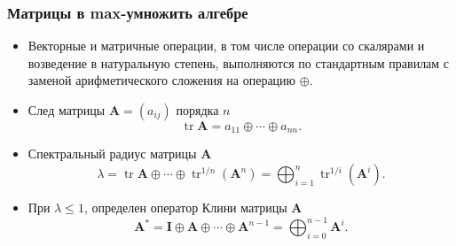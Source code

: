 \documentclass[ucs, notheorems, handout]{beamer}
\begin{document}
\begin{frame}
    \frametitle{Матрицы в max-умножить алгебре}
    \begin{itemize}
        \item Векторные и матричные операции, в том числе операции со скалярами и возведение в натуральную степень, выполняются по стандартным правилам с заменой арифметического сложения на операцию $\oplus$. 
        
        
        
        
        \item След матрицы $\bm{A}=(a_{ij})$ порядка $n$
        $$\mathop\mathrm{tr}\bm{A}=a_{11}\oplus\cdots\oplus a_{nn}.$$

        \item Спектральный радиус матрицы $\bm{A}$
        \begin{equation*}
        \lambda
        =
        \mathop\mathrm{tr}\bm{A}\oplus\cdots\oplus\mathop\mathrm{tr}\nolimits^{1/n}(\bm{A}^{n})
        =
        \bigoplus_{i=1}^{n}{\mathop\mathrm{tr}}^{1/i}(\bm{A}^{i}).
        \end{equation*}

        \item При $\lambda\leq1$, определен оператор Клини матрицы $\bm{A}$
        \begin{equation*}
        \bm{A}^{\ast}
        =
        \bm{I}\oplus\bm{A}\oplus\cdots\oplus\bm{A}^{n-1}
        =
        \bigoplus_{i=0}^{n-1}\bm{A}^{i}.
        \end{equation*}
    \end{itemize}
\end{frame}
\end{document}
